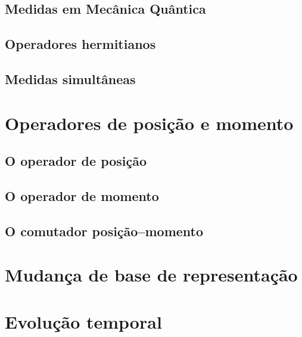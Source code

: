 \documentclass{header}
\begin{document}
            \subsection{Medidas em Mecânica Quântica}
                
        
            \subsection{Operadores hermitianos}
                

            \subsection{Medidas simultâneas}
                

        \section{Operadores de posição e momento}
            

            \subsection{O operador de posição}
                

            \subsection{O operador de momento}

            \subsection{O comutador posição--momento}

        \section{Mudança de base de representação}

        \section{Evolução temporal}
\end{document}
